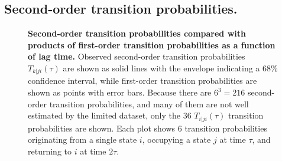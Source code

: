 \subsection{Second-order transition probabilities.}
\label{validation:section:second-order-transition-probabilities}

\begin{figure}[tbp]
  \begin{center}
  \end{center}
  \caption{
  {\bf Second-order transition probabilities compared with products of first-order transition probabilities as a function of lag time.}  
  Observed second-order transition probabilities $T_{k|ji}(\tau)$ are shown as solid lines with the envelope indicating a 68\% confidence interval, while first-order transition probabilities are shown as points with error bars.
  Because there are $6^3 = 216$ second-order transition probabilities, and many of them are not well estimated by the limited dataset, only the 36 $T_{i|ji}(\tau)$ transition probabilities are shown.
  Each plot shows 6 transition probabilities originating from a single state $i$, occupying a state $j$ at time $\tau$, and returning to $i$ at time $2\tau$.
  }
  \label{validation:figure:second-order-transition-probabiliites}
\end{figure}

